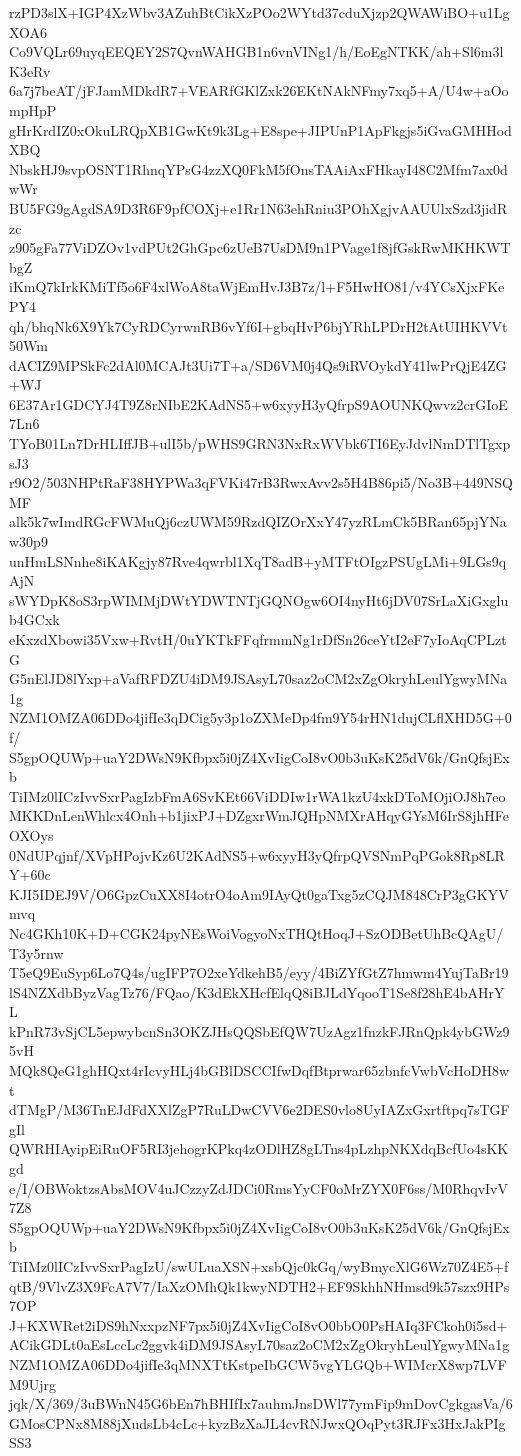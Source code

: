 rzPD3slX+IGP4XzWbv3AZuhBtCikXzPOo2WYtd37cduXjzp2QWAWiBO+u1LgXOA6
Co9VQLr69uyqEEQEY2S7QvnWAHGB1n6vnVINg1/h/EoEgNTKK/ah+Sl6m3lK3eRv
6a7j7beAT/jFJamMDkdR7+VEARfGKlZxk26EKtNAkNFmy7xq5+A/U4w+aOompHpP
gHrKrdIZ0xOkuLRQpXB1GwKt9k3Lg+E8spe+JIPUnP1ApFkgjs5iGvaGMHHodXBQ
NbskHJ9svpOSNT1RhnqYPsG4zzXQ0FkM5fOnsTAAiAxFHkayI48C2Mfm7ax0dwWr
BU5FG9gAgdSA9D3R6F9pfCOXj+e1Rr1N63ehRniu3POhXgjvAAUUlxSzd3jidRzc
z905gFa77ViDZOv1vdPUt2GhGpc6zUeB7UsDM9n1PVage1f8jfGskRwMKHKWTbgZ
iKmQ7kIrkKMiTf5o6F4xlWoA8taWjEmHvJ3B7z/l+F5HwHO81/v4YCsXjxFKePY4
qh/bhqNk6X9Yk7CyRDCyrwnRB6vYf6I+gbqHvP6bjYRhLPDrH2tAtUIHKVVt50Wm
dACIZ9MPSkFc2dAl0MCAJt3Ui7T+a/SD6VM0j4Qs9iRVOykdY41lwPrQjE4ZG+WJ
6E37Ar1GDCYJ4T9Z8rNIbE2KAdNS5+w6xyyH3yQfrpS9AOUNKQwvz2crGIoE7Ln6
TYoB01Ln7DrHLIffJB+ulI5b/pWHS9GRN3NxRxWVbk6TI6EyJdvlNmDTlTgxpsJ3
r9O2/503NHPtRaF38HYPWa3qFVKi47rB3RwxAvv2s5H4B86pi5/No3B+449NSQMF
alk5k7wImdRGcFWMuQj6czUWM59RzdQIZOrXxY47yzRLmCk5BRan65pjYNaw30p9
unHmLSNnhe8iKAKgjy87Rve4qwrbl1XqT8adB+yMTFtOIgzPSUgLMi+9LGs9qAjN
sWYDpK8oS3rpWIMMjDWtYDWTNTjGQNOgw6OI4nyHt6jDV07SrLaXiGxglub4GCxk
eKxzdXbowi35Vxw+RvtH/0uYKTkFFqfrmmNg1rDfSn26ceYtI2eF7yIoAqCPLztG
G5nElJD8lYxp+aVafRFDZU4iDM9JSAsyL70saz2oCM2xZgOkryhLeulYgwyMNa1g
NZM1OMZA06DDo4jifIe3qDCig5y3p1oZXMeDp4fm9Y54rHN1dujCLflXHD5G+0f/
S5gpOQUWp+uaY2DWsN9Kfbpx5i0jZ4XvIigCoI8vO0b3uKsK25dV6k/GnQfsjExb
TiIMz0lICzIvvSxrPagIzbFmA6SvKEt66ViDDIw1rWA1kzU4xkDToMOjiOJ8h7eo
MKKDnLenWhlcx4Onh+b1jixPJ+DZgxrWmJQHpNMXrAHqyGYsM6IrS8jhHFeOXOys
0NdUPqjnf/XVpHPojvKz6U2KAdNS5+w6xyyH3yQfrpQVSNmPqPGok8Rp8LRY+60c
KJI5IDEJ9V/O6GpzCuXX8I4otrO4oAm9IAyQt0gaTxg5zCQJM848CrP3gGKYVmvq
Nc4GKh10K+D+CGK24pyNEsWoiVogyoNxTHQtHoqJ+SzODBetUhBcQAgU/T3y5rnw
T5eQ9EuSyp6Lo7Q4s/ugIFP7O2xeYdkehB5/eyy/4BiZYfGtZ7hmwm4YujTaBr19
lS4NZXdbByzVagTz76/FQao/K3dEkXHcfElqQ8iBJLdYqooT1Se8f28hE4bAHrYL
kPnR73vSjCL5epwybcnSn3OKZJHsQQSbEfQW7UzAgz1fnzkFJRnQpk4ybGWz95vH
MQk8QeG1ghHQxt4rIcvyHLj4bGBlDSCCIfwDqfBtprwar65zbnfcVwbVcHoDH8wt
dTMgP/M36TnEJdFdXXlZgP7RuLDwCVV6e2DES0vlo8UyIAZxGxrtftpq7sTGFgIl
QWRHIAyipEiRuOF5RI3jehogrKPkq4zODlHZ8gLTns4pLzhpNKXdqBcfUo4sKKgd
e/I/OBWoktzsAbsMOV4uJCzzyZdJDCi0RmsYyCF0oMrZYX0F6ss/M0RhqvIvV7Z8
S5gpOQUWp+uaY2DWsN9Kfbpx5i0jZ4XvIigCoI8vO0b3uKsK25dV6k/GnQfsjExb
TiIMz0lICzIvvSxrPagIzU/swULuaXSN+xsbQjc0kGq/wyBmycXlG6Wz70Z4E5+f
qtB/9VlvZ3X9FcA7V7/IaXzOMhQk1kwyNDTH2+EF9SkhhNHmsd9k57szx9HPs7OP
J+KXWRet2iDS9hNxxpzNF7px5i0jZ4XvIigCoI8vO0bbO0PsHAIq3FCkoh0i5sd+
ACikGDLt0aEsLccLc2ggvk4iDM9JSAsyL70saz2oCM2xZgOkryhLeulYgwyMNa1g
NZM1OMZA06DDo4jifIe3qMNXTtKstpeIbGCW5vgYLGQb+WIMcrX8wp7LVFM9Ujrg
jqk/X/369/3uBWnN45G6bEn7hBHIfIx7auhmJnsDWl77ymFip9mDovCgkgasVa/6
GMosCPNx8M88jXudsLb4cLc+kyzBzXaJL4cvRNJwxQOqPyt3RJFx3HxJakPIgSS3
